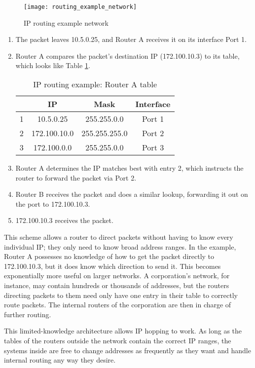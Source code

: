\begin{figure}
\caption{\ac{IP} routing example network}
\label{fig:routing_example_network}
\centering
\texttt{[image: routing\_example\_network]}
\end{figure}

\begin{enumerate}[1.]
\item The packet leaves 10.5.0.25, and Router A receives it on its interface Port 1.
\item Router A compares the packet's destination \ac{IP} (172.100.10.3) to its table, which looks like Table \ref{tbl:routing_example_routera_table}.
	\begin{table}[h]
	\caption{\ac{IP} routing example: Router A table}
	\label{tbl:routing_example_routera_table}
	\centering
	\begin{tabular}{r|c|c|c}
	 & \textbf{\ac{IP}} & \textbf{Mask} & \textbf{Interface}\\
	\hline
	1 & 10.5.0.25 & 255.255.0.0 & Port 1\\
	2 & 172.100.10.0 & 255.255.255.0 & Port 2\\
	3 & 172.100.0.0 & 255.255.0.0 & Port 3\\
	\end{tabular}
	\end{table}
\item Router A determines the \ac{IP} matches best with entry 2, which instructs the router to forward the packet via Port 2.
\item Router B receives the packet and does a similar lookup, forwarding it out on the port to 172.100.10.3.
\item 172.100.10.3 receives the packet.
\end{enumerate}

\par This scheme allows a router to direct packets without having to know every individual IP; they only need to know broad address ranges. In the example, Router A possesses no knowledge of how to get the packet directly to 172.100.10.3, but it does know which direction to send it. This becomes exponentially more useful on larger networks. A corporation's network, for instance, may contain hundreds or thousands of addresses, but the routers directing packets to them need only have one entry in their table to correctly route packets. The internal routers of the corporation are then in charge of further routing.

\par This limited-knowledge architecture allows IP hopping to work. As long as the tables of the routers outside the network contain the correct \ac{IP} ranges, the systems inside are free to change addresses as frequently as they want and handle internal routing any way they desire.

